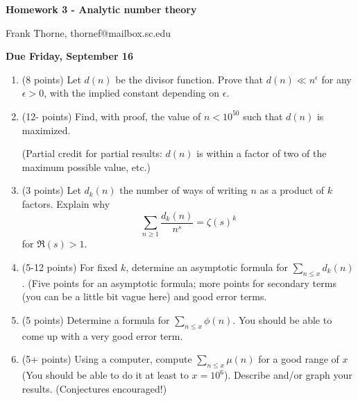 \documentclass[12pt]{article}
\begin{document}
\setlength{\topmargin}{-2mm}





\begin{center}{\bf Homework 3 - Analytic number theory}
\end{center}
\begin{center}Frank Thorne, thornef@mailbox.sc.edu
\end{center}
\begin{center}
{\bf Due Friday, September 16}
\end{center}
\begin{enumerate}
\item (8 points)
Let $d(n)$ be the divisor function. Prove that $d(n) \ll n^{\epsilon}$ for any $\epsilon > 0$, with the implied
constant depending on $\epsilon$.

\item (12- points)
Find, with proof, the value of $n < 10^{50}$ such that $d(n)$ is maximized.

(Partial credit for partial results: $d(n)$ is within a factor of two of the maximum possible value, etc.)

\item (3 points)
Let $d_k(n)$ the number of ways of writing $n$ as a product of $k$ factors. Explain why
\begin{equation}
\sum_{n \geq 1} \frac{ d_k(n) }{n^s} = \zeta(s)^k
\end{equation}
for $\Re(s) > 1$.

\item (5-12 points)
For fixed $k$, determine an asymptotic formula for $\sum_{n \leq x} d_k(n)$. (Five points for an asymptotic
formula; more points for secondary terms (you can be a little bit vague here) and good error terms.

\item (5 points)
Determine a formula for $\sum_{n \leq x} \phi(n)$. You should be able to come up with a very good error term.

\item (5+ points)
Using a computer, compute $\sum_{n \leq x} \mu(n)$ for a good range of $x$ (You should be able to do it at
least to $x = 10^6$). Describe and/or graph your results. (Conjectures encouraged!)

\end{enumerate}
\end{document}
